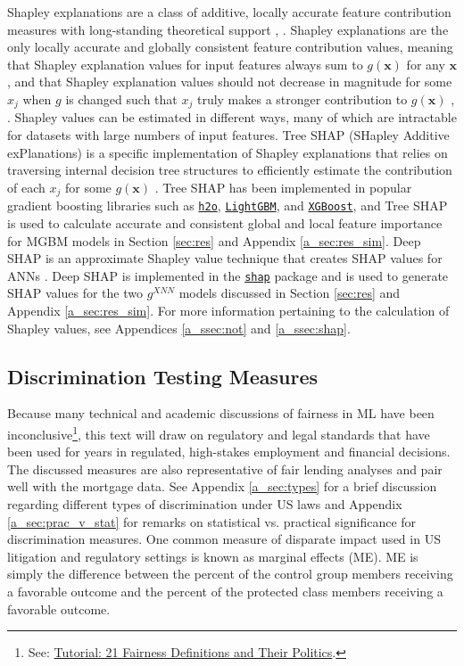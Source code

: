 \documentclass[information,article,submit,moreauthors,pdftex]{definitions/mdpi}
\begin{document}
Shapley explanations are a class of additive, locally accurate feature contribution measures with long-standing theoretical support \cite{shapley}, \cite{shapley1988shapley}. Shapley explanations are the only locally accurate and globally consistent feature contribution values, meaning that Shapley explanation values for input features always sum to $g(\mathbf{x})$ for any $\mathbf{x}$, and that Shapley explanation values should not decrease in magnitude for some $x_j$ when $g$ is changed such that $x_j$ truly makes a stronger contribution to $g(\mathbf{x})$ \cite{shapley}, \cite{tree_shap}. Shapley values can be estimated in different ways, many of which are intractable for datasets with large numbers of input features. Tree SHAP (SHapley Additive exPlanations) is a specific implementation of Shapley explanations that relies on traversing internal decision tree structures to efficiently estimate the contribution of each $x_j$ for some $g(\mathbf{x})$ \cite{tree_shap}. Tree SHAP has been implemented in popular gradient boosting libraries such as \href{http://docs.h2o.ai/h2o/latest-stable/h2o-py/docs/modeling.html#h2ogradientboostingestimator}{\texttt{h2o}}, \href{https://lightgbm.readthedocs.io/en/latest/Python-Intro.html}{\texttt{LightGBM}}, and \href{https://xgboost.readthedocs.io/en/latest/python/python_intro.html}{\texttt{XGBoost}}, and Tree SHAP is used to calculate accurate and consistent global and local feature importance for MGBM models in Section \ref{sec:res} and Appendix \ref{a_sec:res_sim}. Deep SHAP is an approximate Shapley value technique that creates SHAP values for ANNs \cite{shapley}. Deep SHAP is implemented in the \href{https://github.com/slundberg/shap}{\texttt{shap}} package and is used to generate SHAP values for the two $g^{XNN}$ models discussed in Section \ref{sec:res} and Appendix \ref{a_sec:res_sim}. For more information pertaining to the calculation of Shapley values, see Appendices \ref{a_ssec:not} and \ref{a_ssec:shap}.

\subsection{Discrimination Testing Measures}\label{ssec:di}

Because many technical and academic discussions of fairness in ML have been inconclusive\footnote{See: \href{https://www.youtube.com/watch?v=jIXIuYdnyyk}{Tutorial: 21 Fairness Definitions and Their Politics}.}, this text will draw on regulatory and legal standards that have been used for years in regulated, high-stakes employment and financial decisions. The discussed measures are also representative of fair lending analyses and pair well with the mortgage data. See Appendix \ref{a_sec:types} for a brief discussion regarding different types of discrimination under US laws and Appendix \ref{a_sec:prac_v_stat} for remarks on statistical vs. practical significance for discrimination measures. One common measure of disparate impact used in US litigation and regulatory settings is known as marginal effects (ME). ME is simply the difference between the percent of the control group members receiving a favorable outcome and the percent of the protected class members receiving a favorable outcome. 
\end{document}
